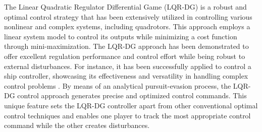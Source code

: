 \documentclass[3p,times]{elsarticle}
\begin{document}
The Linear Quadratic Regulator Differential Game (LQR-DG) is a robust and optimal control strategy that has been extensively utilized in controlling various nonlinear and complex systems, including quadrotors. This approach employs a linear system model to control its outputs while minimizing a cost function through mini-maximization. The LQR-DG approach has been demonstrated to offer excellent regulation performance and control effort while being robust to external disturbances. For instance, it has been successfully applied to control a ship controller, showcasing its effectiveness and versatility in handling complex control problems \cite{6957349, 6160768}.
By means of an analytical pursuit-evasion process, the LQR-DG control approach generates precise and optimized control commands. This unique feature sets the LQR-DG controller apart from other conventional optimal control techniques and enables one player to track the most appropriate control command while the other creates disturbances.
\end{document}
